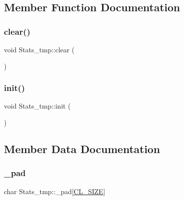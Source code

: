 \subsection{Member Function Documentation}
\mbox{\label{classStats__tmp_a4d3647832cc1cae1c7bf6ff6fd69af52}} 
\subsubsection{\texorpdfstring{clear()}{clear()}}
{\footnotesize\ttfamily void Stats\+\_\+tmp\+::clear (\begin{DoxyParamCaption}{ }\end{DoxyParamCaption})}

\mbox{\label{classStats__tmp_a18d27f8eaaf61c5d456287cdf5ccd5ed}} 
\subsubsection{\texorpdfstring{init()}{init()}}
{\footnotesize\ttfamily void Stats\+\_\+tmp\+::init (\begin{DoxyParamCaption}{ }\end{DoxyParamCaption})}



\subsection{Member Data Documentation}
\mbox{\label{classStats__tmp_ac8d93e0e7dd2fa868d336db72b39ae06}} 
\subsubsection{\texorpdfstring{\+\_\+pad}{\_pad}}
{\footnotesize\ttfamily char Stats\+\_\+tmp\+::\+\_\+pad\mbox{[}\hyperlink{config_8h_aa18ff96566bf8c1f4cd38c1e7bc4ca80}{C\+L\+\_\+\+S\+I\+ZE}\mbox{]}}

\mbox{\label{classStats__tmp_abbeec8b2f63eb8032d1e387da911f00c}} 
